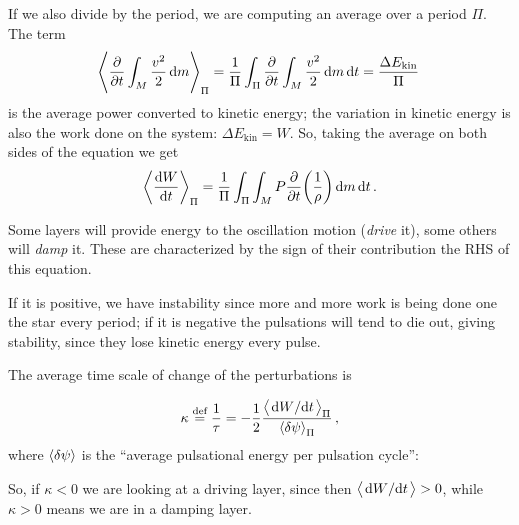 \documentclass[main.tex]{subfiles}
\begin{document}
If we also divide by the period, we are computing an average over a period \(\Pi \). The term 
%
\begin{align}
\expval{\pdv{}{t} \int_{M} \frac{v^2}{2} \dd{m}}_{\Pi }
= \frac{1}{\Pi } \int_{\Pi } \pdv{}{t} \int_{M} \frac{v^2}{2} \dd{m} \dd{t} = \frac{ \Delta E _{\text{kin}}}{\Pi }
\,
\end{align}
%
is the average power converted to kinetic energy; the variation in kinetic energy is also the work done on the system: \(\Delta E _{\text{kin}} = W\). So, taking the average on both sides of the equation we get
%
\begin{equation} \label{eq:driving-damping-layers-1}
\expval{\dv{W}{t}}_\Pi = \frac{1}{\Pi} \int_\Pi \int_M   P \pdv{}{t} \qty(\frac{1}{\rho}) \dd{m} \dd{t}.
\end{equation}

Some layers will provide energy to the oscillation motion (\emph{drive} it), some others will \emph{damp} it.
These are characterized by the sign of their contribution the RHS of this equation.

If it is positive, we have instability since more and more work is being done one the star every period; if it is negative the pulsations will tend to die out, giving stability, since they lose kinetic energy every pulse.

The average time scale of change of the perturbations is

\begin{equation}
  \kappa \defeq \frac{1}{\tau} = -\frac{1}{2} \frac{\expval{\dv*{W}{t}}_\Pi}{\expval{ \delta \psi}_\Pi }
\,,
\end{equation}
%
where \(\expval{ \delta \psi }\) is the ``average pulsational energy per pulsation cycle'': 

So, if \(\kappa < 0\) we are looking at a driving layer, since then \(\expval{ \dv*{W}{t}} >0\), while \(\kappa > 0\) means we are in a damping layer. 
\end{document}
